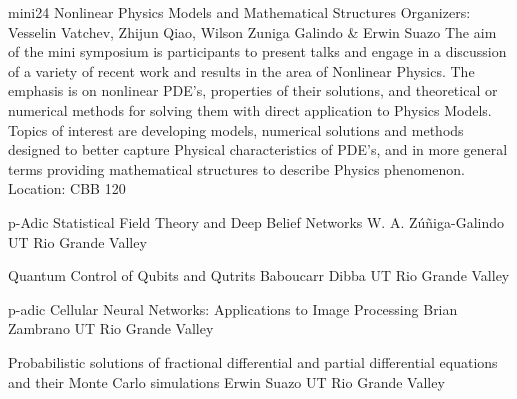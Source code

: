 \mini
{mini24}
{Nonlinear Physics Models and Mathematical Structures}
{Organizers: Vesselin Vatchev, Zhijun Qiao, Wilson Zuniga Galindo \& Erwin Suazo}
{The aim of the mini symposium is participants to present talks and engage in a discussion of a variety of recent work and results in the area of Nonlinear Physics. The emphasis is on nonlinear PDE’s, properties of their solutions, and theoretical or numerical methods for solving them with direct application to Physics Models. Topics of interest are developing models, numerical solutions and methods designed to better capture Physical characteristics of PDE’s, and in more general terms providing mathematical structures to describe Physics phenomenon.}
{Location: CBB 120}

\begin{talks}
\item\talk
{p-Adic Statistical Field Theory and Deep Belief Networks}
{W. A. Zúñiga-Galindo }
{UT Rio Grande Valley}
\item\talk
{Quantum Control of Qubits and Qutrits}
{Baboucarr Dibba}
{UT Rio Grande Valley}
\item\talk
{p-adic Cellular Neural Networks: Applications to Image Processing}
{Brian Zambrano}
{UT Rio Grande Valley}
\item\talk
{Probabilistic solutions of fractional differential and partial differential equations and their Monte Carlo simulations}
{Erwin Suazo}
{UT Rio Grande Valley}
\end{talks}
\room
